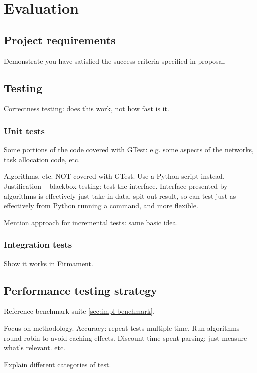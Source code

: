 \chapter{Evaluation} \label{chap:eval}


\section{Project requirements} 

Demonstrate you have satisfied the success criteria specified in proposal.

\section{Testing}

Correctness testing: does this work, not how fast is it.

\subsection{Unit tests}
Some portions of the code covered with GTest: e.g. some aspects of the networks, task allocation code, etc. 

Algorithms, etc. NOT covered with GTest. Use a Python script instead. Justification -- blackbox testing: test the interface. Interface presented by algorithms is effectively just take in data, spit out result, so can test just as effectively from Python running a command, and more flexible.

Mention approach for incremental tests: same basic idea.

\subsection{Integration tests}

Show it works in Firmament.

\section{Performance testing strategy}

Reference benchmark suite \ref{sec:impl-benchmark}. 

Focus on methodology. Accuracy: repeat tests multiple time. Run algorithms round-robin to avoid caching effects. Discount time spent parsing: just measure what's relevant. etc.

Explain different categories of test.

